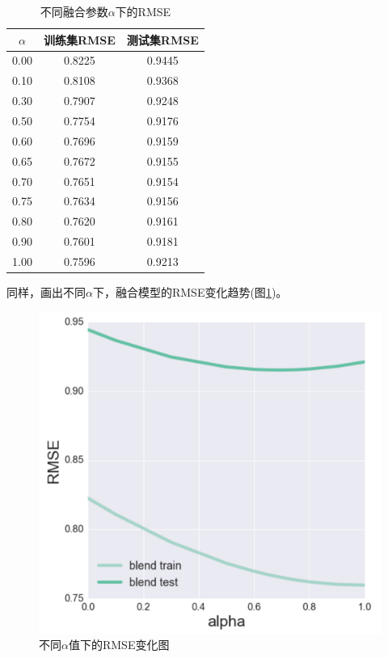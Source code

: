 \documentclass[utf8, a4paper, 11pt, onecolumn]{ctexart}
\begin{document}
\begin{spacing}{1.25}
\begin{table}[ht]
	\centering
	\begin{tabular}{|c|c|c|}
		\hline
		\textbf{$\alpha$} & 训练集RMSE & 测试集RMSE \\
		\hline
		0.00 & 0.8225 & 0.9445 \\
		\hline
		0.10 & 0.8108 & 0.9368 \\
		\hline
		0.30 & 0.7907 & 0.9248 \\
		\hline
		0.50 & 0.7754 & 0.9176 \\
		\hline
		0.60 & 0.7696 & 0.9159 \\
		\hline
		0.65 & 0.7672 & 0.9155 \\
		\hline
		0.70 & 0.7651 & 0.9154 \\
		\hline
		0.75 & 0.7634 & 0.9156 \\
		\hline
		0.80 & 0.7620 & 0.9161 \\
		\hline
		0.90 & 0.7601 & 0.9181 \\
		\hline
		1.00 & 0.7596 & 0.9213 \\
		\hline
	\end{tabular}
	\caption{不同融合参数$\alpha$下的RMSE}
	\label{alpha-table}
\end{table}

同样，画出不同$\alpha$下，融合模型的RMSE变化趋势(图\ref{alpha-figure})。

\begin{figure}[ht]
	\centering
	\includegraphics[width=0.8\linewidth]{alpha-figure.png}
	\caption{不同$\alpha$值下的RMSE变化图}
	\label{alpha-figure}
\end{figure}


\end{spacing}
\end{document}
